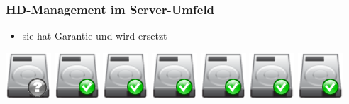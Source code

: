 \documentclass{beamer}
\begin{document}
  \frame
  {
    \frametitle{HD-Management im Server-Umfeld}

    \begin{itemize}
    \item{sie hat Garantie und wird  ersetzt}
    \end{itemize}

    \resizebox{40pt}{40pt}
    {
      \includegraphics{img/hdd_big_unknown.png}
    }
    \resizebox{40pt}{40pt}
    {
      \includegraphics{img/hdd_big_ok.png}
    }
    \resizebox{40pt}{40pt}
    {
      \includegraphics{img/hdd_big_ok.png}
    }
    \resizebox{40pt}{40pt}
    {
      \includegraphics{img/hdd_big_ok.png}
    }
    \resizebox{40pt}{40pt}
    {
      \includegraphics{img/hdd_big_ok.png}
    }
    \resizebox{40pt}{40pt}
    {
      \includegraphics{img/hdd_big_ok.png}
    }
    \resizebox{40pt}{40pt}
    {
      \includegraphics{img/hdd_big_ok.png}
    }
  }

  \section*{}
\end{document}
